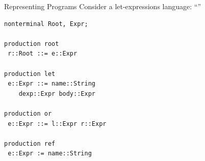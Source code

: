 \documentclass[11pt,aspectratio=169]{beamer}
\newcommand{\ys}{1.3}
\newcommand{\enve}[2]{\draw[blue] ($(#1-0.4,\ys*#2-0.35)$) circle(0.15);}
\newcommand{\envd}[2]{\filldraw[blue] ($(#1-0.4,\ys*#2-0.35)$) circle(0.05);}
\newcommand{\envc}[2]{\filldraw[blue] ($(#1-0.4,\ys*#2-0.35)$) circle(0.15);}
\newcommand{\ppe}[2]{\draw[dgreen] ($(#1+0.4,\ys*#2-0.35)$) circle(0.15);}
\newcommand{\ppd}[2]{\filldraw[dgreen] ($(#1+0.4,\ys*#2-0.35)$) circle(0.05);}
\newcommand{\ppc}[2]{\filldraw[dgreen] ($(#1+0.4,\ys*#2-0.35)$) circle(0.15);}
\newcommand{\vale}[2]{\draw[red] ($(#1+0.8,\ys*#2-0.35)$) circle(0.15);}
\newcommand{\vald}[2]{\filldraw[red] ($(#1+0.8,\ys*#2-0.35)$) circle(0.05);}
\newcommand{\valc}[2]{\filldraw[red] ($(#1+0.8,\ys*#2-0.35)$) circle(0.15);}
\newcommand{\erre}[2]{\draw[orange] ($(#1+1.2,\ys*#2-0.35)$) circle(0.15);}
\newcommand{\rtnna}[3]{
\draw ($(#1,#2*\ys)$) node{#3};

\draw[gray] ($(#1+0.65,\ys*#2+0.25)$) --
            ($(#1-0.3,\ys*#2+0.25)$) arc (90:270:4.5mm);

\draw[gray] ($(#1+0.65,\ys*#2+0.25)$) arc (90:-90:4.5mm) -- 
            ($(#1-0.3,\ys*#2-0.65)$) ;
}
\newcommand{\tnna}[3]{
\rtnna{#1}{#2}{#3}
}
\newcommand{\tnstr}[3]{
\draw ($(#1,#2*\ys)$) node{#3};
\draw[gray] ($(#1+0.25,\ys*#2+0.25)$) --
            ($(#1-0.2,\ys*#2+0.25)$) arc (90:270:2.5mm);

\draw[gray] ($(#1+0.25,\ys*#2+0.25)$) arc (90:-90:2.5mm) -- 
            ($(#1-0.2,\ys*#2-0.25)$) ;

}
\newcommand{\tedge}[4]{
\draw[gray] ($(#1+\xsh,\ys*#2-0.65)$) -- ($(#3+\xsh,\ys*#4+0.25)$);
}
\newcommand{\ppeval}{
\pause
\ppd{4}{4} %
\pause
\ppd{4}{3} %

\pause
\ppd{4}{2} %
\pause
\ppc{4}{2} %
\pause
\ppd{6.5}{2}  %

\pause
\ppd{5.25}{1} %
\pause
\ppc{5.25}{1} %
\pause
\ppd{7.75}{1} %
\pause
\ppc{7.75}{1} %

\pause
\ppc{6.5}{2}  %

\pause
\ppc{4}{3} %

\pause
\ppc{4}{4} %
}
\newcommand{\valeval}{
\pause\vald{4}{4} %
\pause\vald{4}{3} %

\pause\vald{6.5}{2}  %
\pause\vald{5.25}{1} %
\pause\valc{5.25}{1} %

\pause\vald{7.75}{1} %

\pause\envd{7.75}{1} %

\pause\envd{6.5}{2}  %

\pause
\draw ($(5.5,\ys*-0.5)$) node {\small\texttt{body.env = addEnv(name, dval.val, e.env);}};

\pause\vald{4}{2} %
\pause\valc{4}{2} %

\pause\envd{4}{3} %
\pause\envc{4}{3} %

\pause\envc{6.5}{2}  %

\pause
\draw[white] ($(5.5,\ys*-0.5)$) node {\small\texttt{body.env = addEnv(name, dval.val, e.env);}};

\pause\envc{7.75}{1} %

\pause\valc{7.75}{1} %
\pause\valc{6.5}{2}  %

\pause\valc{4}{3} %

\pause\valc{4}{4} %
}
\newcommand{\xsh}{0.15}
\begin{document}
\begin{frame}[t,fragile]{Representing Programs}
Consider a let-expressions language: 
``''

\bigskip

\begin{minipage}[t]{2.9in}
\vspace{0pt}
\end{minipage}
\begin{minipage}[t]{2.1in}
\vspace{0pt}
\small
\begin{verbatim}
nonterminal Root, Expr;

production root
 r::Root ::= e::Expr

production let
 e::Expr ::= name::String 
    dexp::Expr body::Expr

production or
 e::Expr ::= l::Expr r::Expr

production ref
 e::Expr := name::String
\end{verbatim}
\end{minipage}

\end{frame}
\end{document}
